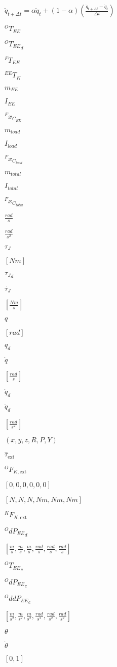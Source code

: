 \documentclass{article}
\begin{document}
$ \ddot{q}_{t + \Delta t} = \alpha \ddot{q}_{t}
+ ( 1 - \alpha)\left(\frac{\dot{q}_{t + \Delta t} - \dot{q}_{t}}{\Delta t}\right) $
\pagebreak

$^{O}T_{EE}$
\pagebreak

${^OT_{EE}}_{d}$
\pagebreak

$^{F}T_{EE}$
\pagebreak

$^{EE}T_{K}$
\pagebreak

$m_{EE}$
\pagebreak

$I_{EE}$
\pagebreak

$^{F}x_{C_{EE}}$
\pagebreak

$m_{load}$
\pagebreak

$I_{load}$
\pagebreak

$^{F}x_{C_{load}}$
\pagebreak

$m_{total}$
\pagebreak

$I_{total}$
\pagebreak

$^{F}x_{C_{total}}$
\pagebreak

$\frac{rad}{s}$
\pagebreak

$\frac{rad}{s^2}$
\pagebreak

$\tau_{J}$
\pagebreak

$[Nm]$
\pagebreak

${\tau_J}_d$
\pagebreak

$\dot{\tau_{J}}$
\pagebreak

$[\frac{Nm}{s}]$
\pagebreak

$q$
\pagebreak

$[rad]$
\pagebreak

$q_d$
\pagebreak

$\dot{q}$
\pagebreak

$[\frac{rad}{s}]$
\pagebreak

$\dot{q}_d$
\pagebreak

$\ddot{q}_d$
\pagebreak

$[\frac{rad}{s^2}]$
\pagebreak

$(x,y,z,R,P,Y)$
\pagebreak

$\hat{\tau}_{\text{ext}}$
\pagebreak

$^OF_{K,\text{ext}}$
\pagebreak

$[0,0,0,0,0,0]$
\pagebreak

$[N,N,N,Nm,Nm,Nm]$
\pagebreak

$^{K}F_{K,\text{ext}}$
\pagebreak

${^OdP_{EE}}_{d}$
\pagebreak

$[\frac{m}{s},\frac{m}{s},\frac{m}{s},\frac{rad}{s},\frac{rad}{s},\frac{rad}{s}]$
\pagebreak

${^OT_{EE}}_{c}$
\pagebreak

${^OdP_{EE}}_{c}$
\pagebreak

${^OddP_{EE}}_{c}$
\pagebreak

$[\frac{m}{s^2},\frac{m}{s^2},\frac{m}{s^2},\frac{rad}{s^2},\frac{rad}{s^2},\frac{rad}{s^2}]$
\pagebreak

$\theta$
\pagebreak

$\dot{\theta}$
\pagebreak

$[0, 1]$
\pagebreak
\end{document}
